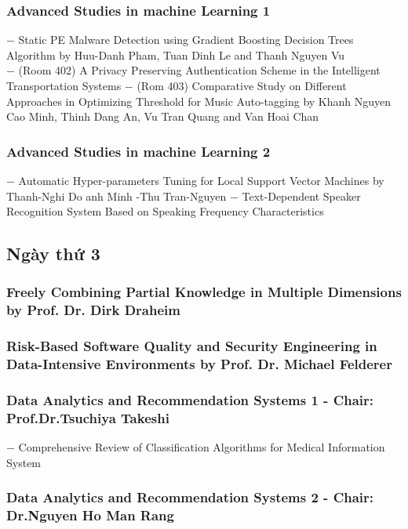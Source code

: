 \documentclass{hcmutarticle}
\begin{document}
\subsubsection{Advanced Studies in machine Learning 1}
$-$ Static PE Malware Detection using Gradient Boosting Decision Trees Algorithm by Huu-Danh Pham, Tuan Dinh Le and Thanh Nguyen Vu \\
$-$ (Room 402) A Privacy Preserving Authentication Scheme in the Intelligent Transportation Systems
$-$ (Rom 403) Comparative Study on Different Approaches in Optimizing Threshold for Music Auto-tagging by Khanh Nguyen Cao Minh, Thinh Dang An, Vu Tran Quang and Van Hoai Chan
\subsubsection{Advanced Studies in machine Learning 2}
$-$ Automatic Hyper-parameters Tuning for Local Support Vector Machines by Thanh-Nghi Do anh Minh -Thu Tran-Nguyen
$-$ Text-Dependent Speaker Recognition System Based on Speaking Frequency Characteristics

\subsection{Ngày thứ 3}
\subsubsection{Freely Combining Partial Knowledge in Multiple Dimensions
by Prof. Dr. Dirk Draheim}
\subsubsection{Risk-Based Software Quality and Security Engineering in Data-Intensive Environments
by Prof. Dr. Michael Felderer}
\subsubsection{ Data Analytics and Recommendation Systems 1 - Chair: Prof.Dr.Tsuchiya Takeshi}
$-$ Comprehensive Review of Classification Algorithms for Medical Information System

\subsubsection{ Data Analytics and Recommendation Systems 2 - Chair: Dr.Nguyen Ho Man Rang}

\end{document}
